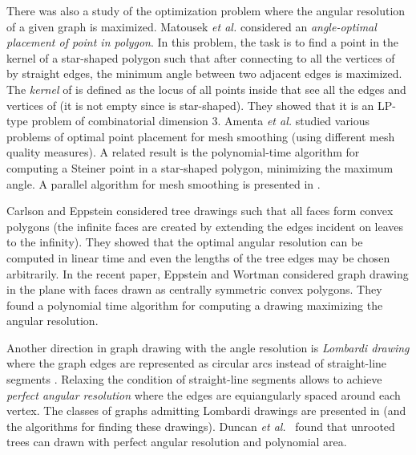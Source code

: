 \documentclass[10pt]{article}
\newcommand{\etal}{\textit{et al.}}
\begin{document}
There was also a study of the optimization problem where the angular resolution of a given graph is maximized.
Matousek \etal \cite{msw-96} considered an {\em angle-optimal placement of point in polygon}. In this problem,  the task is to find a point  in the kernel of a star-shaped polygon  such that after connecting  to all the vertices of  by straight edges, the minimum angle 
between two adjacent edges is maximized. The {\em kernel} of   is defined as the locus of 
all points inside  that see all the edges and vertices of  (it is not empty since  is star-shaped). They showed that it is an LP-type problem of combinatorial dimension 3.
Amenta \etal \cite{abe-99} studied various problems of optimal point placement for mesh smoothing (using different mesh quality measures). A related result is the polynomial-time 
algorithm for computing a Steiner point in a star-shaped polygon, minimizing 
the maximum angle. A parallel algorithm for mesh smoothing is presented in 
\cite{mesh1}.


Carlson and Eppstein \cite{ce-tcf-06} considered tree drawings such that  all faces form  convex polygons (the infinite faces are created by extending the edges incident on leaves to the infinity). They showed that the optimal angular resolution can be computed in linear time and even the lengths of the tree edges may be chosen arbitrarily.
In the recent paper, Eppstein and Wortman \cite{ew-oar-11} considered 
graph drawing in the plane with faces drawn as centrally symmetric convex polygons. 
They found a polynomial time algorithm for computing a drawing maximizing the angular resolution. 

Another direction in graph drawing with the angle resolution is {\em  Lombardi drawing} where 
the graph edges are represented as circular arcs instead of straight-line segments 
\cite{ccgkt-11,degkn-10,degkn-12}.
Relaxing  the condition of straight-line segments allows to achieve {\em perfect angular resolution} where the edges are equiangularly spaced around each vertex. 
The classes of graphs admitting Lombardi drawings are presented in \cite{degkn-12} (and the algorithms for finding these drawings). 
Duncan \etal~\cite{degkn-10} found  that unrooted trees can drawn with perfect angular resolution and polynomial area.
\end{document}
